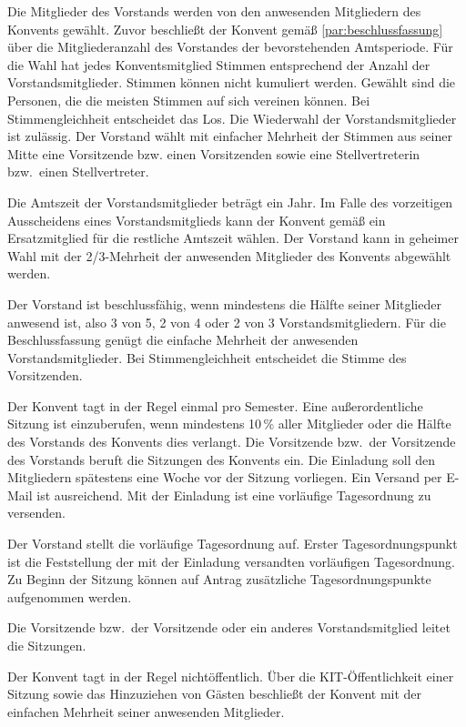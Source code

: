 \documentclass[a4paper, parskip=half, numbers=noenddot]{scrartcl}
\begin{document}
\begin{contract}
Die Mitglieder des Vorstands werden von den anwesenden Mitgliedern des Konvents gewählt. 
Zuvor beschließt der Konvent gemäß
\ref{par:beschlussfassung} über die Mitgliederanzahl des 
Vorstandes der bevorstehenden Amtsperiode.
Für die Wahl hat jedes Konventsmitglied Stimmen entsprechend der Anzahl der Vorstandsmitglieder. Stimmen können nicht kumuliert werden.
Gewählt sind die Personen, die die meisten Stimmen auf sich vereinen können. Bei Stimmengleichheit entscheidet das Los. Die Wiederwahl der Vorstandsmitglieder ist zulässig.
Der Vorstand wählt mit einfacher Mehrheit der Stimmen aus seiner Mitte eine Vorsitzende bzw.
einen Vorsitzenden sowie eine Stellvertreterin bzw.\ einen Stellvertreter.
\label{wahl}

Die Amtszeit der Vorstandsmitglieder beträgt ein Jahr. Im Falle des vorzeitigen Ausscheidens
eines Vorstandsmitglieds kann der Konvent gemäß  ein Ersatzmitglied für die restliche Amtszeit wählen. Der Vorstand kann in geheimer Wahl mit der 2/3-Mehrheit der anwesenden Mitglieder des Konvents abgewählt werden.

Der Vorstand ist beschlussfähig, wenn mindestens die Hälfte seiner Mitglieder anwesend ist, also 3 von 5, 2
von 4 oder 2 von 3 Vorstandsmitgliedern.
Für die Beschlussfassung genügt die einfache Mehrheit der anwesenden Vorstandsmitglieder. Bei Stimmengleichheit entscheidet die Stimme des Vorsitzenden.


Der Konvent tagt in der Regel einmal pro Semester. 
Eine außerordentliche Sitzung ist einzuberufen, wenn mindestens 10\,\% aller Mitglieder oder die Hälfte des Vorstands des Konvents dies verlangt.
Die Vorsitzende bzw.\ der Vorsitzende des Vorstands beruft die Sitzungen des Konvents ein.
Die Einladung soll den Mitgliedern spätestens eine Woche vor der Sitzung vorliegen. Ein Versand per E-Mail ist ausreichend. Mit der Einladung ist eine vorläufige Tagesordnung zu versenden.

Der Vorstand stellt die vorläufige Tagesordnung auf. Erster Tagesordnungspunkt ist die Feststellung der mit der Einladung versandten vorläufigen Tagesordnung. Zu Beginn der Sitzung können auf Antrag zusätzliche Tagesordnungspunkte aufgenommen werden.

Die Vorsitzende bzw.\ der Vorsitzende oder ein anderes Vorstandsmitglied leitet die Sitzungen.	

Der Konvent tagt in der Regel nichtöffentlich. Über die KIT-Öffentlichkeit einer Sitzung sowie das Hinzuziehen von Gästen beschließt der Konvent mit der einfachen Mehrheit seiner anwesenden Mitglieder.


\end{contract}
\end{document}
